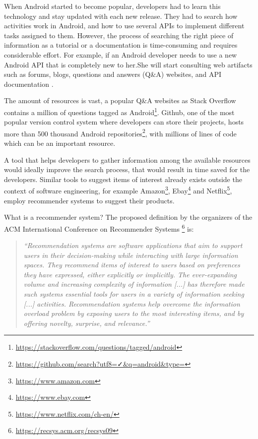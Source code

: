 \documentclass[12pt,mscthesis]{usiinfthesis}
\begin{document}
	When Android started to become popular, developers had to learn this technology and stay updated with each new release.
	They had to search how activities work in Android, and how to use several APIs to implement different tasks assigned to them.
	However, the process of searching the right piece of information as a tutorial or a documentation is time-consuming and requires considerable effort.
	For example, if an Android developer needs to use a new Android API that is completely new to her.She will start consulting web artifacts such as forums, blogs, questions and answers (Q\&A) websites, and API documentation \cite{Sim:2011:WSE:2063239.2063243}.


	The amount of resources is vast, a popular Q\&A websites as Stack Overflow contains a million of questions tagged as Android\footnote{\url{https://stackoverflow.com/questions/tagged/android}}. Github, one of the most popular version control system where developers can store their projects, hosts more than 500 thousand Android repositories\footnote{\url{https://github.com/search?utf8=✓&q=android&type=}}, with millions of lines of code which can be an important resource.


	A tool that helps developers to gather information among the available resources would ideally improve the search process, that would result in time saved for the developers.
	Similar tools to suggest items of interest already exists outside the context of software engineering, for example Amazon\footnote{\url{https://www.amazon.com}}, Ebay\footnote{\url{https://www.ebay.com}} and Netflix\footnote{\url{https://www.netflix.com/ch-en/}}, employ recommender systems to suggest their products.


	What is a recommender system? The proposed definition by the organizers of the ACM International Conference on Recommender Systems \footnote{\url{https://recsys.acm.org/recsys09}} is: \\

	  \blockquote{\textit{``Recommendation systems are software applications that aim to support users in their decision-making while interacting with large information spaces. They recommend items of interest to users based on preferences they have expressed, either explicitly or implicitly. The ever-expanding volume and increasing complexity of information [...] has therefore made such systems essential tools for users in a variety of information seeking [...] activities. Recommendation systems help overcome the information overload problem by exposing users to the most interesting items, and by offering novelty, surprise, and relevance.''}}
\end{document}
